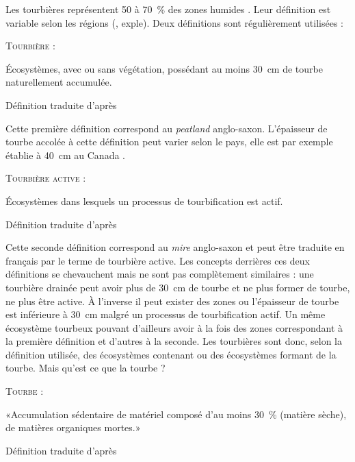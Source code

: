 Les tourbières représentent 50 à \SI{70}{\percent} des zones humides \cite{joosten2002}.
Leur définition est variable selon les régions (\plop, exple).
Deux définitions sont régulièrement utilisées :

\begin{pdef}
\textsc{Tourbière} :

Écosystèmes, avec ou sans végétation, possédant au moins \SI{30}{\cm} de tourbe naturellement accumulée.

\hfill {\scriptsize Définition traduite d'après \citet{joosten2002}}
\end{pdef}
Cette première définition correspond au \textit{peatland} anglo-saxon.
L'épaisseur de tourbe accolée à cette définition peut varier selon le pays, elle est par exemple établie à \SI{40}{\cm} au Canada \citep{nationalwetlandsworkinggroup1997}.
\begin{pdef}
\textsc{Tourbière active} :

Écosystèmes dans lesquels un processus de tourbification est actif.

\hfill {\scriptsize Définition traduite d'après \citet{joosten2002}}
\end{pdef}
Cette seconde définition correspond au \textit{mire} anglo-saxon et peut être traduite en français par le terme de tourbière active.
Les concepts derrières ces deux définitions se chevauchent mais ne sont pas complètement similaires : une tourbière drainée peut avoir plus de \SI{30}{cm} de tourbe et ne plus former de tourbe, ne plus être active.
À l'inverse il peut exister des zones ou l'épaisseur de tourbe est inférieure à \SI{30}{cm} malgré un processus de tourbification actif.
Un même écosystème tourbeux pouvant d'ailleurs avoir à la fois des zones correspondant à la première définition et d'autres à la seconde.
Les tourbières sont donc, selon la définition utilisée, des écosystèmes contenant ou des écosystèmes formant de la tourbe.
Mais qu'est ce que la tourbe ?

\begin{pdef}
\textsc{Tourbe} :

«Accumulation sédentaire de matériel composé d'au moins \SI{30}{\percent} (matière sèche), de matières organiques mortes.»

\hfill {\scriptsize Définition traduite d'après \citet{joosten2002}}
\end{pdef}

